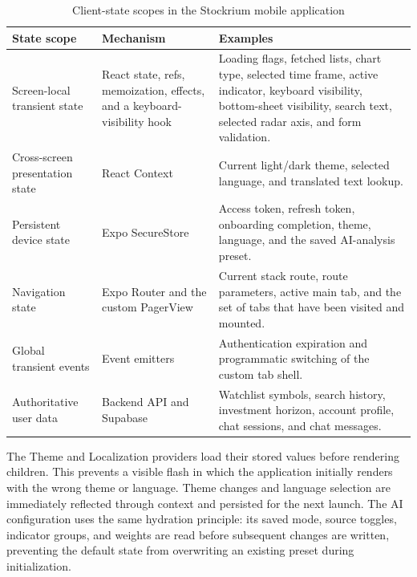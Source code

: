 \begin{table}[H]
    \centering
    \caption{Client-state scopes in the Stockrium mobile application}
    \label{tab:client-state-scopes}
    \small
    \begin{tabularx}{\textwidth}{>{\raggedright\arraybackslash}p{3.1cm} >{\raggedright\arraybackslash}p{4.1cm} X}
        \toprule
        \textbf{State scope} & \textbf{Mechanism} & \textbf{Examples} \\
        \midrule
        Screen-local transient state & React state, refs, memoization, effects, and a keyboard-visibility hook & Loading flags, fetched lists, chart type, selected time frame, active indicator, keyboard visibility, bottom-sheet visibility, search text, selected radar axis, and form validation. \\
        \addlinespace
        Cross-screen presentation state & React Context & Current light/dark theme, selected language, and translated text lookup. \\
        \addlinespace
        Persistent device state & Expo SecureStore & Access token, refresh token, onboarding completion, theme, language, and the saved AI-analysis preset. \\
        \addlinespace
        Navigation state & Expo Router and the custom PagerView & Current stack route, route parameters, active main tab, and the set of tabs that have been visited and mounted. \\
        \addlinespace
        Global transient events & Event emitters & Authentication expiration and programmatic switching of the custom tab shell. \\
        \addlinespace
        Authoritative user data & Backend API and Supabase & Watchlist symbols, search history, investment horizon, account profile, chat sessions, and chat messages. \\
        \bottomrule
    \end{tabularx}
\end{table}

The Theme and Localization providers load their stored values before rendering children. This prevents a visible flash in which the application initially renders with the wrong theme or language. Theme changes and language selection are immediately reflected through context and persisted for the next launch. The AI configuration uses the same hydration principle: its saved mode, source toggles, indicator groups, and weights are read before subsequent changes are written, preventing the default state from overwriting an existing preset during initialization.

